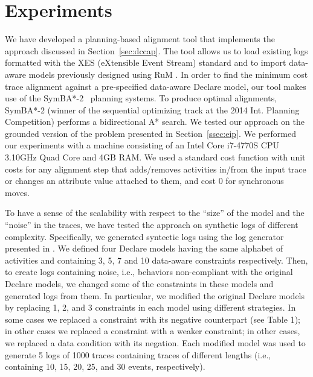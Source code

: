 \section{Experiments}
\label{sec:experiments}



We have developed a planning-based alignment tool that implements the approach discussed in Section~\ref{sec:dccap}.
%
The tool allows us to load existing logs formatted with the XES (eXtensible Event Stream) standard and to import data-aware models previously designed using RuM \cite{AlmanCHMN20}.
%
%
%
In order to find the minimum cost trace alignment against a pre-specified data-aware Declare model, our tool makes use of the SymBA*-2~\cite{torralba2014symba} planning systems. To produce optimal alignments, SymBA*-2 (winner of the sequential optimizing track at the 2014 Int. Planning Competition) performs a bidirectional A* search.
%
We tested our approach on the grounded version of the problem presented in Section~\ref{ssec:eip}. We performed our experiments with a machine consisting of an Intel Core i7-4770S CPU 3.10GHz Quad Core and 4GB RAM. We used a standard cost function with unit costs for any alignment step that adds/removes activities in/from the input trace or changes an attribute value attached to them, and cost 0 for synchronous moves.

%
To have a sense of the scalability with respect to the ``size'' of the model and the ``noise'' in the traces, we have tested the approach on synthetic logs of different complexity.
%
Specifically, we generated syntectic logs using the log generator presented in \cite{SkydanienkoFGM18}. We defined four Declare models having the same alphabet of activities and containing 3, 5, 7 and 10 data-aware constraints respectively.
%
Then, to create logs containing noise, i.e., behaviors non-compliant with the original Declare models, we changed some of the constraints in these models and generated logs from them. In particular, we modified the original Declare models by replacing 1, 2, and 3 constraints in each model using different strategies. In some cases we replaced a constraint with its negative counterpart (see Table 1); in other cases we replaced a constraint with a weaker constraint; in other cases, we replaced a data condition with its negation. Each modified model was used to generate 5 logs of 1000 traces containing traces of different lengths (i.e., containing 10, 15, 20, 25, and 30 events, respectively).

